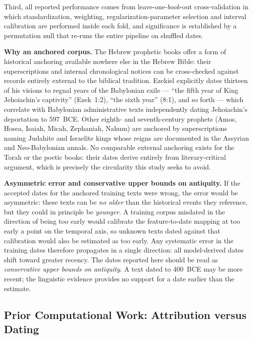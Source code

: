 \documentclass[10pt,letterpaper]{article}
\begin{document}
Third, all reported performance comes from leave-one-\emph{book}-out
cross-validation in which standardization, weighting, regularization-parameter
selection and interval calibration are performed inside each fold, and
significance is established by a permutation null that re-runs the entire
pipeline on shuffled dates.

\textbf{Why an anchored corpus.}  The Hebrew prophetic books offer a form of
historical anchoring available nowhere else in the Hebrew Bible: their
superscriptions and internal chronological notices can be cross-checked
against records entirely external to the biblical tradition.  Ezekiel
explicitly dates thirteen of his visions to regnal years of the Babylonian
exile --- ``the fifth year of King Jehoiachin's captivity'' (Ezek~1:2), ``the
sixth year'' (8:1), and so forth --- which correlate with Babylonian
administrative texts independently dating Jehoiachin's deportation to
597~BCE.  Other eighth- and seventh-century prophets (Amos, Hosea, Isaiah,
Micah, Zephaniah, Nahum) are anchored by superscriptions naming Judahite and
Israelite kings whose reigns are documented in the Assyrian and
Neo-Babylonian annals.  No comparable external anchoring exists for the Torah
or the poetic books: their dates derive entirely from literary-critical
argument, which is precisely the circularity this study seeks to avoid.

\textbf{Asymmetric error and conservative upper bounds on antiquity.}  If the
accepted dates for the anchored training texts were wrong, the error would be
asymmetric: these texts can be \emph{no older} than the historical events they
reference, but they could in principle be \emph{younger}.  A training corpus
misdated in the direction of being too early would calibrate the
feature-to-date mapping at too early a point on the temporal axis, so unknown
texts dated against that calibration would also be estimated as too early.
Any systematic error in the training dates therefore propagates in a single
direction: all model-derived dates shift toward greater recency.  The dates
reported here should be read as \emph{conservative upper bounds on
antiquity}.  A text dated to 400~BCE may be more recent; the linguistic
evidence provides no support for a date earlier than the estimate.

\subsection*{Prior Computational Work: Attribution versus Dating}
\end{document}
